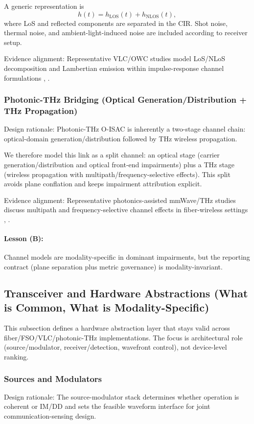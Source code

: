 A generic representation is
\[
h(t)=h_{\text{LOS}}(t)+h_{\text{NLOS}}(t),
\]
where LoS and reflected components are separated in the CIR. Shot noise, thermal noise, and ambient-light-induced noise are included according to receiver setup.

Evidence alignment: Representative VLC/OWC studies model LoS/NLoS decomposition and Lambertian emission within impulse-response channel formulations \cite{O_ISAC_039}, \cite{O_ISAC_022}.

\subsubsection{Photonic-THz Bridging (Optical Generation/Distribution + THz Propagation)}
Design rationale: Photonic-THz O-ISAC is inherently a two-stage channel chain: optical-domain generation/distribution followed by THz wireless propagation.

We therefore model this link as a split channel: an optical stage (carrier generation/distribution and optical front-end impairments) plus a THz stage (wireless propagation with multipath/frequency-selective effects). This split avoids plane conflation and keeps impairment attribution explicit.

Evidence alignment: Representative photonics-assisted mmWave/THz studies discuss multipath and frequency-selective channel effects in fiber-wireless settings \cite{O_ISAC_241}, \cite{O_ISAC_077}.

\paragraph{Lesson (B):} Channel models are modality-specific in dominant impairments, but the reporting contract (plane separation plus metric governance) is modality-invariant.

\subsection{Transceiver and Hardware Abstractions (What is Common, What is Modality-Specific)}
This subsection defines a hardware abstraction layer that stays valid across fiber/FSO/VLC/photonic-THz implementations. The focus is architectural role (source/modulator, receiver/detection, wavefront control), not device-level ranking.

\subsubsection{Sources and Modulators}
Design rationale: The source-modulator stack determines whether operation is coherent or IM/DD and sets the feasible waveform interface for joint communication-sensing design.

